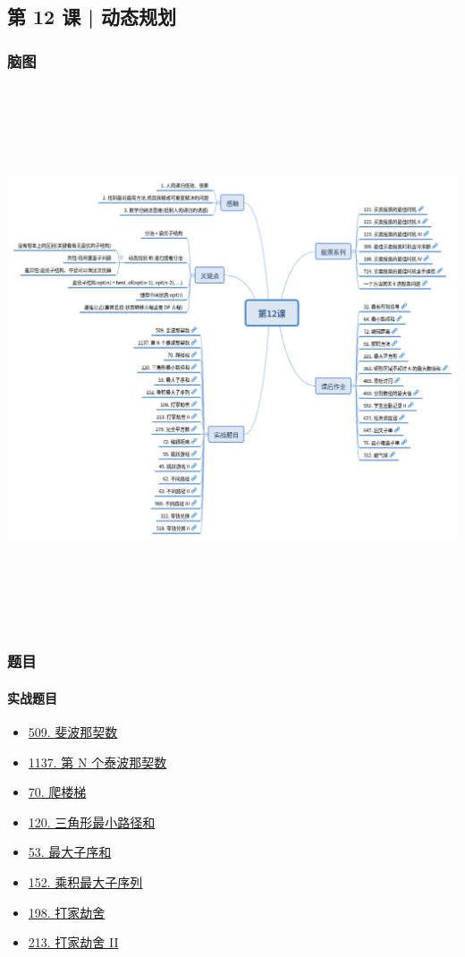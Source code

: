 \subsection{第 12 课 | 动态规划}

\subsubsection{脑图}

\includegraphics[width=170mm,height=160mm]{images/camp/第12课.png}

\subsubsection{题目}

\paragraph{实战题目}

\begin{itemize}
  \item \hyperref[leetcode:509]{509. 斐波那契数}
  \item \hyperref[leetcode:1137]{1137. 第 N 个泰波那契数}
  \item \hyperref[leetcode:70]{70. 爬楼梯}
  \item \hyperref[leetcode:120]{120. 三角形最小路径和}
  \item \hyperref[leetcode:53]{53. 最大子序和}
  \item \hyperref[leetcode:152]{152. 乘积最大子序列}
  \item \hyperref[leetcode:198]{198. 打家劫舍}
  \item \hyperref[leetcode:213]{213. 打家劫舍 II}
\end{itemize}

